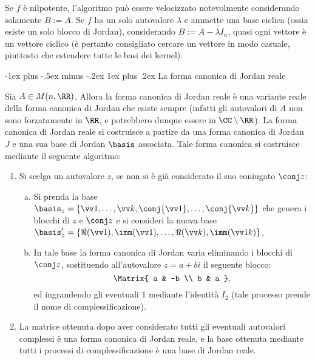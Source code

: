 \documentclass[10pt,landscape]{article}
\makeatletter
\renewcommand{\subsubsection}{\@startsection{subsubsection}{3}{0mm}%
	{-1ex plus -.5ex minus -.2ex}%
	{1ex plus .2ex}%
	{\normalfont\small\bfseries}}
\makeatother
\begin{document}
\begin{multicols}{3}
		Se $f$ è nilpotente, l'algoritmo può essere velocizzato notevolmente considerando
		solamente $B := A$. Se $f$ ha un solo autovalore $\lambda$ e ammette una base ciclica (ossia esiste un solo blocco di Jordan), considerando $B := A - \lambda I_n$,
		quasi ogni vettore è un vettore ciclico (è pertanto consigliato cercare un vettore
		in modo casuale, piuttosto che estendere tutte le basi dei kernel).
		
		\subsubsection{La forma canonica di Jordan reale}

		Sia $A \in M(n, \RR)$. Allora
		la forma canonica di Jordan reale è una variante reale della forma canonica di
		Jordan che esiste sempre (infatti gli autovalori di $A$ non sono forzatamente
		in $\RR$, e potrebbero dunque essere in $\CC \setminus \RR$). La forma canonica di
		Jordan reale si costruisce a partire da una forma canonica di Jordan $J$
		e una sua base di Jordan $\basis$ associata. Tale forma canonica
		si costruisce mediante il seguente algoritmo:
		
		\begin{enumerate}
			\item Si scelga un autovalore $z$, se non si è già considerato il
			suo coniugato $\conj z$:
			\begin{enumerate}[a.]
				\item Si prenda la base $\basis_z = \{\vv 1, \ldots, \vv k, \conj{\vv 1}, \ldots, \conj{\vv k}\}$ che
				genera i blocchi di $z$ e $\conj z$ e si consideri la nuova
				base $\basis_z' = \{ \Re(\vv 1), \imm(\vv 1), \ldots, \Re(\vv k), \imm(\vv 1k) \}$,
				\item In tale base la forma canonica di Jordan varia eliminando i blocchi
				di $\conj z$, sostituendo all'autovalore $z = a + bi$ il seguente blocco:
				\[ \Matrix{
					a & -b \\ b & a
				}, \]
				ed ingrandendo gli eventuali $1$ mediante l'identità $I_2$ (tale processo prende
				il nome di complessificazione).
			\end{enumerate}
			\item La matrice ottenuta dopo aver considerato tutti gli eventuali autovalori complessi è una forma canonica di Jordan reale, e la base ottenuta mediante
			tutti i processi di complessificazione è una base di Jordan reale.
		\end{enumerate}


\end{multicols}
\end{document}
